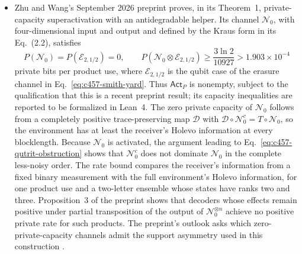 \begin{itemize}
  \item Zhu and Wang's September 2026 preprint proves, in its Theorem~1, private-capacity superactivation with an antidegradable helper. Its channel $\mathcal N_0$, with four-dimensional input and output and defined by the Kraus form in its Eq.~(2.2), satisfies
\begin{equation}
 P(\mathcal N_0)=P(\mathcal E_{2,1/2})=0,
 \qquad
 P(\mathcal N_0\otimes\mathcal E_{2,1/2})\geq\frac{3\ln2}{10927}>1.903\times10^{-4}
 \label{eq:c457-private-superactivation}
\end{equation}
private bits per product use, where $\mathcal E_{2,1/2}$ is the qubit case of the erasure channel in Eq.~\eqref{eq:c457-smith-yard}. Thus $\mathsf{Act}_P$ is nonempty, subject to the qualification that this is a recent preprint result; its capacity inequalities are reported to be formalized in Lean~4. The zero private capacity of $\mathcal N_0$ follows from a completely positive trace-preserving map $\mathcal D$ with $\mathcal D\circ\mathcal N_0^c=T\circ\mathcal N_0$, so the environment has at least the receiver's Holevo information at every blocklength. Because $\mathcal N_0$ is activated, the argument leading to Eq.~\eqref{eq:c457-qutrit-obstruction} shows that $\mathcal N_0^c$ does not dominate $\mathcal N_0$ in the complete less-noisy order. The rate bound compares the receiver's information from a fixed binary measurement with the full environment's Holevo information, for one product use and a two-letter ensemble whose states have ranks two and three. Proposition~3 of the preprint shows that decoders whose effects remain positive under partial transposition of the output of $\mathcal N_0^{\otimes n}$ achieve no positive private rate for such products. The preprint's outlook asks which zero-private-capacity channels admit the support asymmetry used in this construction .


\end{itemize}
